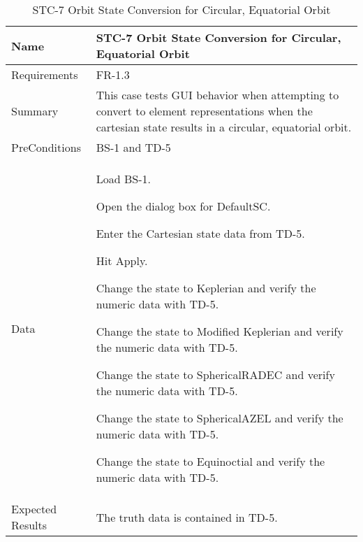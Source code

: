 

\begin{table}[htbp!]
\centering
      \begin{tabular}{|p{1.05 in} |p{4.75 in} |}
      \hline
         \rowcolor[rgb]{0.8,0.8,0.8} Name & STC-7 Orbit State Conversion for Circular, Equatorial Orbit\\
         \hline
         Requirements & FR-1.3\\  \hline
         Summary &
         This  case tests GUI behavior when attempting to convert to element representations when the
         cartesian state results in a circular, equatorial orbit.
         \\     \hline
         PreConditions & BS-1 and TD-5\\     \hline
         Data &
         \begin{compactenum}
             \item Load BS-1.
             \item Open the dialog box for DefaultSC.
             \item Enter the Cartesian state data from TD-5.
             \item Hit Apply.
             \item Change the state to Keplerian and verify the numeric data with TD-5.
             \item Change the state to Modified Keplerian and verify the numeric data with TD-5.
             \item Change the state to SphericalRADEC and verify the numeric data with TD-5.
             \item Change the state to SphericalAZEL and verify the numeric data with TD-5.
             \item Change the state to Equinoctial and verify the numeric data with TD-5.
         \end{compactenum}
         \\ \hline
         Expected Results & The truth data is contained in TD-5.\\
      \hline
      \end{tabular}
      \label{Table:STC-7}
      \caption{STC-7 Orbit State Conversion for Circular, Equatorial Orbit}
\end{table} 